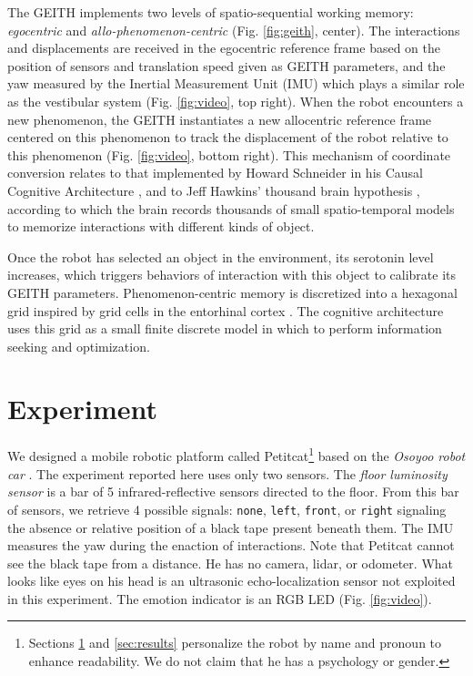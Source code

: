 \documentclass[runningheads]{llncs}
\begin{document}
The GEITH implements two levels of spatio-sequential working memory: \textit{egocentric} and \textit{allo-phenomenon-centric} (Fig. \ref{fig:geith}, center).  
The interactions and displacements are received in the egocentric reference frame based on the position of sensors and translation speed given as GEITH parameters, and the yaw measured by the Inertial Measurement Unit (IMU) which plays a similar role as the vestibular system %
(Fig. \ref{fig:video}, top right).
When the robot encounters a new phenomenon, the GEITH instantiates a new allocentric reference frame centered on this phenomenon to track the displacement of the robot relative to this phenomenon (Fig. \ref{fig:video}, bottom right). 
This mechanism of coordinate conversion relates to that implemented by Howard Schneider in his Causal Cognitive Architecture \cite{schneider_emergence_2024}, and to
Jeff Hawkins' thousand brain hypothesis \cite{hawkins_framework_2019}, according to which the brain records thousands of small spatio-temporal models to memorize interactions with different kinds of object.

Once the robot has selected an object in the environment, its serotonin level increases, which triggers behaviors of interaction with this object to calibrate its GEITH parameters. 
Phenomenon-centric memory is discretized into a hexagonal grid inspired by grid cells in the entorhinal cortex \cite{moser_place_2008}. 
The cognitive architecture uses this grid as a small finite discrete model in which to perform information seeking and optimization. %


\section{Experiment}
\label{sec:expe}

We designed a mobile robotic platform called Petitcat\footnote{Sections \ref{sec:expe} and \ref{sec:results} personalize the robot by name and pronoun to enhance readability. We do not claim that he has a psychology or gender.} based on the \textit{Osoyoo robot car} \cite{osoyoo_robot_car}.
The experiment reported here uses only two sensors.
The \textit{floor luminosity sensor} is a bar of 5 infrared-reflective sensors directed to the floor.
From this bar of sensors, we retrieve 4 possible signals:  \texttt{none},  \texttt{left},  \texttt{front}, or \texttt{right} signaling the absence or relative position of a black tape present beneath them.  
The IMU measures the yaw during the enaction of interactions.
Note that Petitcat cannot see the black tape from a distance. 
He has no camera, lidar, or odometer.
What looks like eyes on his head is an ultrasonic echo-localization sensor not exploited in this experiment. 
The emotion indicator is an RGB LED (Fig. \ref{fig:video}). 
\end{document}
